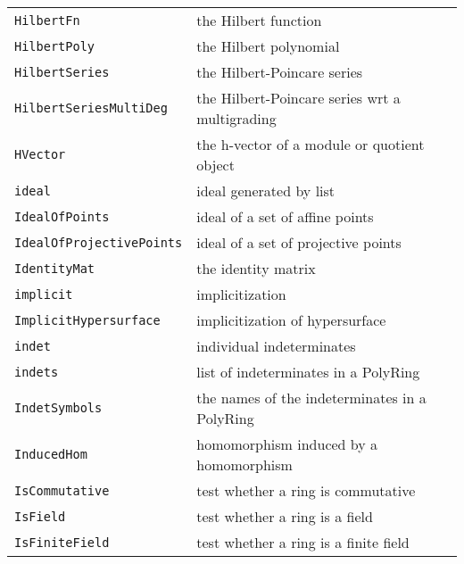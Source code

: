 \documentclass[a4paper]{mybook}
\begin{document}
\begin{center}
\begin{longtable}{ll}
{\verb~HilbertFn~} &
      the Hilbert function\\
   
{\verb~HilbertPoly~} &
      the Hilbert polynomial\\
   
{\verb~HilbertSeries~} &
      the Hilbert-Poincare series\\
   
{\verb~HilbertSeriesMultiDeg~} &
      the Hilbert-Poincare series wrt a multigrading\\
   
{\verb~HVector~} &
      the h-vector of a module or quotient object\\
   
{\verb~ideal~} &
      ideal generated by list\\
   
{\verb~IdealOfPoints~} &
      ideal of a set of affine points\\
   
{\verb~IdealOfProjectivePoints~} &
      ideal of a set of projective points\\
   
{\verb~IdentityMat~} &
      the identity matrix\\
   
{\verb~implicit~} &
      implicitization\\
   
{\verb~ImplicitHypersurface~} &
      implicitization of hypersurface\\
   
{\verb~indet~} &
      individual indeterminates\\
   
{\verb~indets~} &
      list of indeterminates in a PolyRing\\
   
{\verb~IndetSymbols~} &
      the names of the indeterminates in a PolyRing\\
   
{\verb~InducedHom~} &
      homomorphism induced by a homomorphism\\
   
{\verb~IsCommutative~} &
      test whether a ring is commutative\\
   
{\verb~IsField~} &
      test whether a ring is a field\\
   
{\verb~IsFiniteField~} &
      test whether a ring is a finite field\\
   

\end{longtable}
\end{center}
\end{document}
